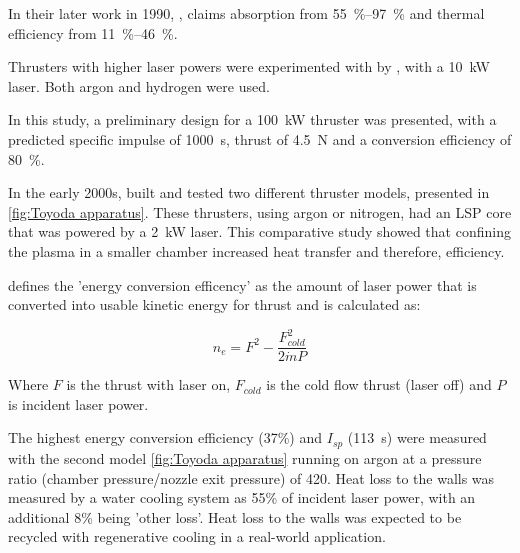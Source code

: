         In their later work in 1990, \textcite{zerkleLasersustainedArgonPlasmas1990}, claims absorption from \qtyrange{55}{97}{\%} and thermal efficiency from \qtyrange{11}{46}{\%}. %


        Thrusters with higher laser powers were experimented with by \textcite{blackLaserPropulsion10kW1995}, with a \qty{10}{kW}  laser. Both argon and hydrogen were used.

        In this study, a preliminary design for a \qty{100}{kW} thruster was presented, with a predicted specific impulse of \qty{1000}{s}, thrust of \qty{4.5}{N} and a conversion efficiency of \qty{80}{\%}.


        In the early 2000s, \textcite{toyodaThrustPerformanceCW2002} built and tested two different thruster models, presented in \autoref{fig:Toyoda apparatus}. These thrusters, using argon or nitrogen, had an LSP core that was powered by a \qty{2}{kW}  laser. This comparative study showed that confining the plasma in a smaller chamber increased heat transfer and therefore, efficiency. 
        
        \textcite{toyodaThrustPerformanceCW2002} defines the 'energy conversion efficency' as the amount of laser power that is converted into usable kinetic energy for thrust and is calculated as:

        \[ n_e = F^2 - \frac{F^2_{cold}}{2 \dot{m} P}\]

        Where $F$ is the thrust with laser on, $F_{cold}$ is the cold flow thrust (laser off) and $P$ is incident laser power.

        The highest energy conversion efficiency (37\%) and $I_{sp}$ (\qty{113}{s}) were measured with the second model \autoref{fig:Toyoda apparatus} running on argon at a pressure ratio (chamber pressure/nozzle exit pressure) of 420. Heat loss to the walls was measured by a water cooling system as 55\% of incident laser power, with an additional 8\% being 'other loss'. Heat loss to the walls was expected to be recycled with regenerative cooling in a real-world application.

